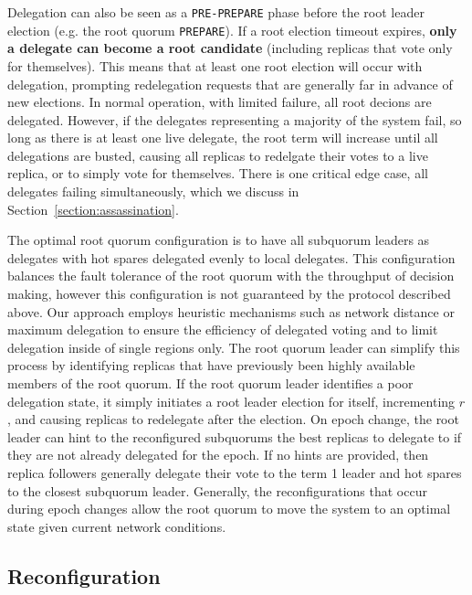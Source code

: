\documentclass[10pt,conference]{IEEEtran}
\newcommand{\sub}{subquorum\xspace}
\newcommand{\subs}{subquorums\xspace}
\newcommand{\roo}{root quorum\xspace}
\begin{document}
Delegation can also be seen as a \texttt{PRE-PREPARE} phase before the root leader
election (e.g. the root quorum \texttt{PREPARE}).
If a root election timeout expires, \textbf{only a delegate can become a root candidate}
(including replicas that vote only for themselves).
This means that at least one root election will occur with delegation, prompting
redelegation requests that are generally far in advance of new elections. In normal
operation, with limited failure, all root decions are delegated.
However, if the delegates representing a majority of the system fail, so long as there
is at least one live delegate, the root term will increase until all delegations are
busted, causing all replicas to redelgate their votes to a live replica, or to simply
vote for themselves.
There is one critical edge case, all delegates failing simultaneously, which we discuss
in Section~\ref{section:assassination}.

The optimal \roo configuration is to have all \sub leaders as delegates with hot spares
delegated evenly to local delegates.
This configuration balances the fault tolerance of the \roo with the throughput of
decision making, however this configuration is not guaranteed by the protocol described
above.
Our approach employs heuristic mechanisms such as network distance or maximum delegation
to ensure the efficiency of delegated voting and to limit delegation inside of single
regions only.
The \roo leader can simplify this process by identifying replicas that have previously
been highly available members of the root quorum.
If the \roo leader identifies a poor delegation state, it simply initiates a root leader
election for itself, incrementing $r$, and causing replicas to redelegate after the
election.
On epoch change, the root leader can hint to the reconfigured \subs the best replicas
to delegate to if they are not already delegated for the epoch.
If no hints are provided, then replica followers generally delegate their vote to the
term 1 leader and hot spares to the closest subquorum leader.
Generally, the reconfigurations that occur during epoch changes allow the \roo to move
the system to an optimal state given current network conditions.

\subsection{Reconfiguration}
\label{section:reconfiguration}

\end{document}
